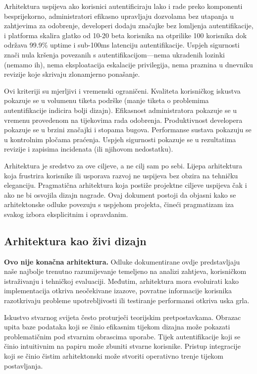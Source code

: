 \documentclass[12pt,a4paper]{article}
\begin{document}
Arhitektura uspijeva ako korisnici autentificiraju lako i rade preko komponenti besprijekorno, administratori efikasno upravljaju dozvolama bez utapanja u zahtjevima za odobrenje, developeri dodaju značajke bez lomljenja autentifikacije, i platforma skalira glatko od 10-20 beta korisnika na otprilike 100 korisnika dok održava 99.9\% uptime i sub-100ms latenciju autentifikacije. Uspjeh sigurnosti znači nula kršenja povezanih s autentifikacijom—nema ukradenih lozinki (nemamo ih), nema eksploatacija eskalacije privilegija, nema praznina u dnevniku revizije koje skrivaju zlonamjerno ponašanje.

Ovi kriteriji su mjerljivi i vremenski ograničeni. Kvaliteta korisničkog iskustva pokazuje se u volumenu tiketa podrške (manje tiketa o problemima autentifikacije indicira bolji dizajn). Efikasnost administratora pokazuje se u vremenu provedenom na tijekovima rada odobrenja. Produktivnost developera pokazuje se u brzini značajki i stopama bugova. Performanse sustava pokazuju se u kontrolnim pločama praćenja. Uspjeh sigurnosti pokazuje se u rezultatima revizije i zapisima incidenata (ili njihovom nedostatku).

Arhitektura je sredstvo za ove ciljeve, a ne cilj sam po sebi. Lijepa arhitektura koja frustrira korisnike ili usporava razvoj ne uspijeva bez obzira na tehničku eleganciju. Pragmatična arhitektura koja postiže projektne ciljeve uspijeva čak i ako ne bi osvojila dizajn nagrade. Ovaj dokument postoji da objasni kako se arhitektonske odluke povezuju s uspjehom projekta, čineći pragmatizam iza svakog izbora eksplicitnim i opravdanim.

\subsection{Arhitektura kao živi dizajn}

\textbf{Ovo nije konačna arhitektura.} Odluke dokumentirane ovdje predstavljaju naše najbolje trenutno razumijevanje temeljeno na analizi zahtjeva, korisničkom istraživanju i tehničkoj evaluaciji. Međutim, arhitektura mora evoluirati kako implementacija otkriva neočekivane izazove, povratne informacije korisnika razotkrivaju probleme upotrebljivosti ili testiranje performansi otkriva uska grla.

Iskustvo stvarnog svijeta često proturječi teorijskim pretpostavkama. Obrazac upita baze podataka koji se činio efikasnim tijekom dizajna može pokazati problematičnim pod stvarnim obrascima uporabe. Tijek autentifikacije koji se činio intuitivnim na papiru može zbuniti stvarne korisnike. Pristup integracije koji se činio čistim arhitektonski može stvoriti operativno trenje tijekom postavljanja.
\end{document}
